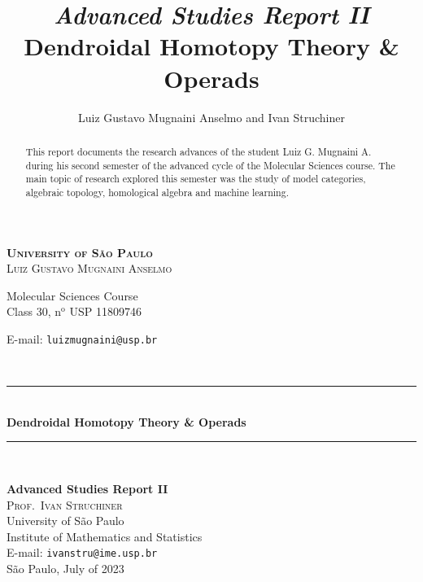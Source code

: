 \documentclass[11pt, reqno]{amsart}
\newcommand{\HRule}{\rule{\linewidth}{0.5mm}} %
\theoremstyle{definition}
\begin{document}


\begin{titlepage}
 \vfill
  \begin{center}
       \textsc{\LARGE \textbf{University of São Paulo}} \\[2.0cm]

       \vskip 0.5cm
       \textsc{\large Luiz Gustavo Mugnaini Anselmo}

       {\normalsize Molecular Sciences Course \\
         Class 30, n\(^{\text{o}}\)
         USP 11809746

       E-mail: \texttt{luizmugnaini@usp.br}}\\[2.0cm]

       \HRule\\
       \vskip 0.5cm
       {\LARGE \textbf{Dendroidal Homotopy Theory \& Operads}}
       \HRule\\[1.5cm]

       \hspace{.45\textwidth}
       \begin{minipage}{.5\textwidth}
       \normalsize \textbf{Advanced Studies Report II}\\[0.5cm]

       \textsc{\large Prof.~Ivan Struchiner}\\
       University of São Paulo \\
       Institute of Mathematics and Statistics \\
       E-mail: \texttt{ivanstru@ime.usp.br}\\[1cm]

       \normalsize São Paulo, July of 2023
       \end{minipage}
  \end{center}
\end{titlepage}

\title[Dendroidal Homotopy Theory \& Operads]{%
{\footnotesize\sl Advanced Studies Report II} \\ \smallskip
  Dendroidal Homotopy Theory \& Operads
}%

\author{%
  Luiz Gustavo Mugnaini Anselmo and Ivan Struchiner
}%

\address{%
  Institute of Mathematics and Statistics, University of São
  Paulo, Rua do Matão 1010, 05508--090~São Paulo, SP
}%


\begin{abstract}
This report documents the research advances of the student Luiz G. Mugnaini
A. during his second semester of the advanced cycle of the Molecular Sciences
course. The main topic of research explored this semester was the study of model
categories, algebraic topology, homological algebra and machine learning.
\end{abstract}
\maketitle
\end{document}
